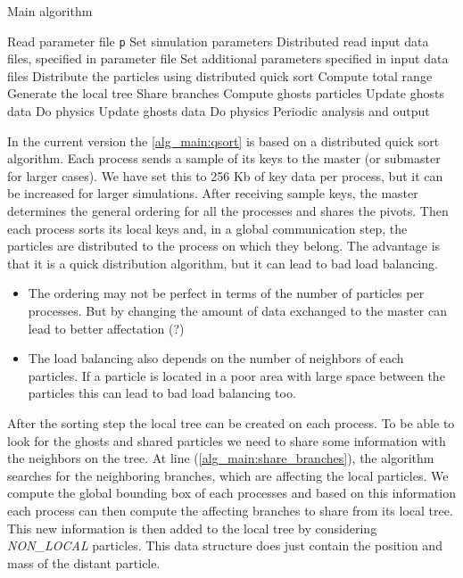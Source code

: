 \documentclass{article}
\begin{document}
\begin{algorithm}
\caption{Main algorithm}\label{alg:main_distributed}
\begin{algorithmic}[1]
\State Read parameter file {\tt p}
\State Set simulation parameters
\State Distributed read input data files, specified in parameter file
\State Set additional parameters specified in input data files
\State Distribute the particles using distributed quick sort 
       \label{alg_main:qsort}
\State Compute total range
\State Generate the local tree
\State Share branches\label{alg_main:share_branches}
\State Compute ghosts particles\label{alg_main:cp_ghosts}
\State Update ghosts data\label{alg_main:up_ghosts}
\State Do physics
\State Update ghosts data
\State Do physics
\State Periodic analysis and output
\EndWhile
\EndProcedure
\end{algorithmic}
\end{algorithm}

In the current version the \ref{alg_main:qsort} is based on a distributed
quick sort algorithm.
Each process sends a sample of its keys to the master (or submaster for larger cases).
We have set this to 256 Kb of key data per process, but it can be increased
for larger simulations.
After receiving sample keys, the master determines the general ordering for
all the processes and shares the pivots.
Then each process sorts its local keys and, in a global communication step,
the particles are distributed to the process on which they belong.
The advantage is that it is a quick distribution algorithm, but it can lead to
bad load balancing.
\begin{itemize}
\item The ordering may not be perfect in terms of the number of particles per
processes. But by changing the amount of data exchanged to the master can lead
to better affectation (?)
\item The load balancing also depends on the number of neighbors of each
particles. If a particle is located in a poor area with large space between the
particles this can lead to bad load balancing too.
\end{itemize}

After the sorting step the local tree can be created on each process.
To be able to look for the ghosts and shared particles we need to share some
information with the neighbors on the tree.
At line (\ref{alg_main:share_branches}), the algorithm searches for the
neighboring branches, which are affecting the local particles.
We compute the global bounding box of each processes and based on this
information each process can then compute the affecting branches to share from
its local tree.
This new information is then added to the local tree by considering
\textit{NON\_LOCAL} particles.
This data structure does just contain the position and mass of the distant
particle.
\end{document}
